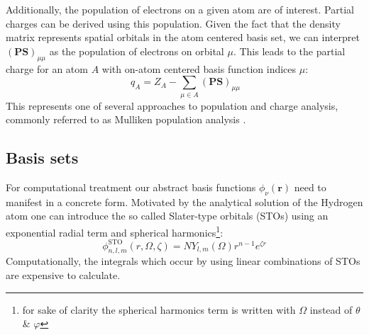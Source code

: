 Additionally, the population of electrons on a given atom are of interest. Partial charges can be derived using this population. Given the fact that the density matrix represents spatial orbitals in the atom centered basis set, we can interpret $\mathbf{(PS)}_{\mu \mu}$ as the population of electrons on orbital $\mu$. This leads to the partial charge for an atom $A$ with on-atom centered basis function indices $\mu$:
\begin{equation}
    \
    q_A = Z_A - \sum_{\mu \in A} \mathbf{(PS)}_{\mu \mu}
\end{equation}
This represents one of several approaches to population and charge analysis, commonly referred to as Mulliken population analysis \parencite{ref:mulliken1955electronic}. 
\subsection{Basis sets}
\label{subsec:background_hf_basis_sets}
For computational treatment our abstract basis functions $\phi_\nu(\mathbf{r})$ need to manifest in a concrete form. 
Motivated by the analytical solution of the Hydrogen atom one can introduce the so called Slater-type orbitals (STOs) using an exponential radial term and spherical harmonics\footnote{for sake of clarity the spherical harmonics term is written with $\Omega$ instead of $\theta$ \& $\varphi$}: 
\begin{equation}
    \label{eq:slater_orbital}
    \phi_{n, l, m}^{\text{STO}}(r, \Omega, \zeta) = N Y_{l,m}(\Omega) r^{n-1} e^{\zeta r}
\end{equation} 
Computationally, the integrals which occur by using linear combinations of STOs are expensive to calculate. \\

